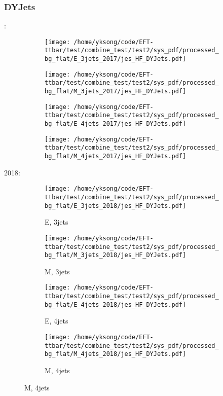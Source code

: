\documentclass{beamer}
\begin{document}
\begin{frame}
\frametitle{DYJets}
\fontsize{5}{1}:
\begin{figure}
\centering
\begin{subfigure}[b]{0.24\textwidth}
\texttt{[image: /home/yksong/code/EFT-ttbar/test/combine\_test/test2/sys\_pdf/processed\_bg\_flat/E\_3jets\_2017/jes\_HF\_DYJets.pdf]}
\end{subfigure}
\begin{subfigure}[b]{0.24\textwidth}
\texttt{[image: /home/yksong/code/EFT-ttbar/test/combine\_test/test2/sys\_pdf/processed\_bg\_flat/M\_3jets\_2017/jes\_HF\_DYJets.pdf]}
\end{subfigure}
\begin{subfigure}[b]{0.24\textwidth}
\texttt{[image: /home/yksong/code/EFT-ttbar/test/combine\_test/test2/sys\_pdf/processed\_bg\_flat/E\_4jets\_2017/jes\_HF\_DYJets.pdf]}
\end{subfigure}
\begin{subfigure}[b]{0.24\textwidth}
\texttt{[image: /home/yksong/code/EFT-ttbar/test/combine\_test/test2/sys\_pdf/processed\_bg\_flat/M\_4jets\_2017/jes\_HF\_DYJets.pdf]}
\end{subfigure}
\end{figure}
2018:
\begin{figure}
\centering
\begin{subfigure}[b]{0.24\textwidth}
\texttt{[image: /home/yksong/code/EFT-ttbar/test/combine\_test/test2/sys\_pdf/processed\_bg\_flat/E\_3jets\_2018/jes\_HF\_DYJets.pdf]}
\captionsetup{font=tiny}
\caption{E, 3jets}
\end{subfigure}
\begin{subfigure}[b]{0.24\textwidth}
\texttt{[image: /home/yksong/code/EFT-ttbar/test/combine\_test/test2/sys\_pdf/processed\_bg\_flat/M\_3jets\_2018/jes\_HF\_DYJets.pdf]}
\captionsetup{font=tiny}
\caption{M, 3jets}
\end{subfigure}
\begin{subfigure}[b]{0.24\textwidth}
\texttt{[image: /home/yksong/code/EFT-ttbar/test/combine\_test/test2/sys\_pdf/processed\_bg\_flat/E\_4jets\_2018/jes\_HF\_DYJets.pdf]}
\captionsetup{font=tiny}
\caption{E, 4jets}
\end{subfigure}
\begin{subfigure}[b]{0.24\textwidth}
\texttt{[image: /home/yksong/code/EFT-ttbar/test/combine\_test/test2/sys\_pdf/processed\_bg\_flat/M\_4jets\_2018/jes\_HF\_DYJets.pdf]}
\captionsetup{font=tiny}
\caption{M, 4jets}
\end{subfigure}
\end{figure}
\end{frame}
\end{document}
